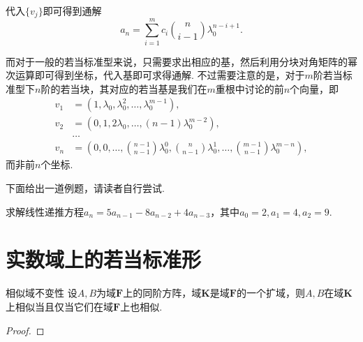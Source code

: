代入$\{v_j\}$即可得到通解
\[
    a_n = \sum_{i = 1}^m c_i \binom{n}{i - 1} \lambda_0^{n - i + 1}.
\]

而对于一般的若当标准型来说，只需要求出相应的基，然后利用分块对角矩阵的幂次运算即可得到坐标，代入基即可求得通解. 不过需要注意的是，对于$m$阶若当标准型下$n$阶的若当块，其对应的若当基是我们在$m$重根中讨论的前$n$个向量，即
\begin{align*}
    v_1 & = (1, \lambda_0, \lambda_0^2, \ldots, \lambda_0^{m - 1}), \\ v_2 & = (0, 1, 2 \lambda_0, \ldots, (n - 1) \lambda_0^{m - 2}), \\ & \ldots \\ v_n & = (0, 0, \ldots, \binom{n - 1}{n - 1} \lambda_0^0, \binom{n}{n - 1} \lambda_0^1, \ldots, \binom{m - 1}{n - 1} \lambda_0^{m - n}),
\end{align*}
而非前$n$个坐标.

下面给出一道例题，请读者自行尝试.

\begin{example}{}{}
    求解线性递推方程$a_n = 5a_{n - 1} - 8a_{n - 2} + 4a_{n - 3}$，其中$a_0 = 2, a_1 = 4, a_2 = 9$.
\end{example}

\section{实数域上的若当标准形} \label{sec:实数域上的若当标准形}

\begin{theorem}{}{相似域不变性}
    设$A,B$为域$\mathbf{F}$上的同阶方阵，域$\mathbf{K}$是域$\mathbf{F}$的一个扩域，则$A,B$在域$\mathbf{K}$上相似当且仅当它们在域$\mathbf{F}$上也相似.
\end{theorem}
\begin{proof}

\end{proof}

